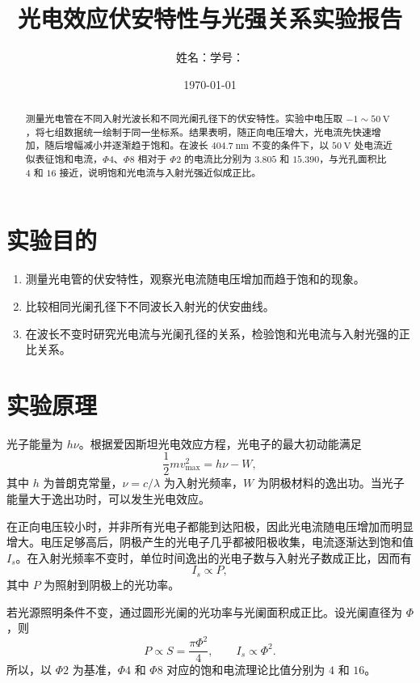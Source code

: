 \documentclass[12pt,a4paper]{ctexart}
\title{\bfseries 光电效应伏安特性与光强关系实验报告}
\author{姓名：\underline{\hspace{3cm}}\quad 学号：\underline{\hspace{3cm}}}
\date{\today}
\begin{document}
\maketitle

\begin{abstract}
测量光电管在不同入射光波长和不同光阑孔径下的伏安特性。实验中电压取 $-1\sim50\ \mathrm{V}$，将七组数据统一绘制于同一坐标系。结果表明，随正向电压增大，光电流先快速增加，随后增幅减小并逐渐趋于饱和。在波长 $404.7\ \mathrm{nm}$ 不变的条件下，以 $50\ \mathrm{V}$ 处电流近似表征饱和电流，$\Phi4$、$\Phi8$ 相对于 $\Phi2$ 的电流比分别为 $3.805$ 和 $15.390$，与光孔面积比 $4$ 和 $16$ 接近，说明饱和光电流与入射光强近似成正比。
\end{abstract}

\section{实验目的}
\begin{enumerate}
  \item 测量光电管的伏安特性，观察光电流随电压增加而趋于饱和的现象。
  \item 比较相同光阑孔径下不同波长入射光的伏安曲线。
  \item 在波长不变时研究光电流与光阑孔径的关系，检验饱和光电流与入射光强的正比关系。
\end{enumerate}

\section{实验原理}
光子能量为 $h\nu$。根据爱因斯坦光电效应方程，光电子的最大初动能满足
\begin{equation}
  \frac{1}{2}m v_{\max}^{2}=h\nu-W,
\end{equation}
其中 $h$ 为普朗克常量，$\nu=c/\lambda$ 为入射光频率，$W$ 为阴极材料的逸出功。当光子能量大于逸出功时，可以发生光电效应。

在正向电压较小时，并非所有光电子都能到达阳极，因此光电流随电压增加而明显增大。电压足够高后，阴极产生的光电子几乎都被阳极收集，电流逐渐达到饱和值 $I_s$。在入射光频率不变时，单位时间逸出的光电子数与入射光子数成正比，因而有
\begin{equation}
  I_s\propto P,
\end{equation}
其中 $P$ 为照射到阴极上的光功率。

若光源照明条件不变，通过圆形光阑的光功率与光阑面积成正比。设光阑直径为 $\Phi$，则
\begin{equation}
  P\propto S=\frac{\pi\Phi^{2}}{4},
  \qquad I_s\propto\Phi^{2}.
\end{equation}
所以，以 $\Phi2$ 为基准，$\Phi4$ 和 $\Phi8$ 对应的饱和电流理论比值分别为 $4$ 和 $16$。
\end{document}
